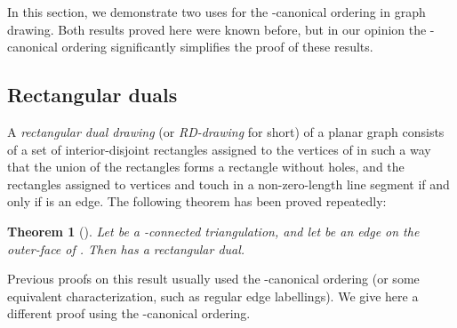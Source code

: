 \documentclass[12pt]{article}
\newtheorem{theorem}{Theorem}
\begin{document}
In this section, we demonstrate two uses for the -canonical
ordering in graph drawing.  Both results proved here were known before,
but in our opinion the -canonical ordering significantly simplifies
the proof of these results.

\subsection{Rectangular duals}
\label{sec:rd}


A {\em rectangular dual drawing} (or {\em RD-drawing} for short) of a 
planar graph  consists of
a set of interior-disjoint rectangles assigned to the vertices of  
in such a way that the union of the rectangles forms a rectangle without
holes, and the rectangles assigned to vertices  and  touch in a
non-zero-length line segment if and only if  is an edge.
The following theorem has been proved repeatedly:

\begin{theorem}[\cite{Ung53,Tho84,KH97}]
Let  be a -connected triangulation, and let 
be an edge on the outer-face of .  Then  has a rectangular
dual.
\end{theorem}

Previous proofs on this result usually used the -canonical
ordering (or some equivalent characterization, such as regular
edge labellings).  We give here a different proof using the
-canonical ordering.
\end{document}
